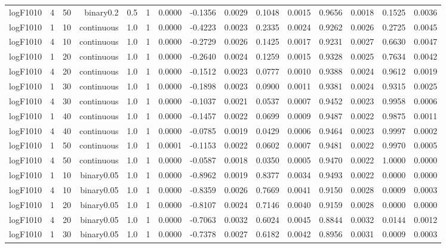 \begin{longtable}{rrrrrrrrrrrrrrr}
  logF1010 & 4 & 50 & binary0.2 & 0.5 & 1 & 0.0000 & -0.1356 & 0.0029 & 0.1048 & 0.0015 & 0.9656 & 0.0018 & 0.1525 & 0.0036 \\ 
  logF1010 & 1 & 10 & continuous & 1.0 & 1 & 0.0000 & -0.4223 & 0.0023 & 0.2335 & 0.0024 & 0.9262 & 0.0026 & 0.2725 & 0.0045 \\ 
  logF1010 & 4 & 10 & continuous & 1.0 & 1 & 0.0000 & -0.2729 & 0.0026 & 0.1425 & 0.0017 & 0.9231 & 0.0027 & 0.6630 & 0.0047 \\ 
  logF1010 & 1 & 20 & continuous & 1.0 & 1 & 0.0000 & -0.2640 & 0.0024 & 0.1259 & 0.0015 & 0.9328 & 0.0025 & 0.7634 & 0.0042 \\ 
  logF1010 & 4 & 20 & continuous & 1.0 & 1 & 0.0000 & -0.1512 & 0.0023 & 0.0777 & 0.0010 & 0.9388 & 0.0024 & 0.9612 & 0.0019 \\ 
  logF1010 & 1 & 30 & continuous & 1.0 & 1 & 0.0000 & -0.1898 & 0.0023 & 0.0900 & 0.0011 & 0.9381 & 0.0024 & 0.9315 & 0.0025 \\ 
  logF1010 & 4 & 30 & continuous & 1.0 & 1 & 0.0000 & -0.1037 & 0.0021 & 0.0537 & 0.0007 & 0.9452 & 0.0023 & 0.9958 & 0.0006 \\ 
  logF1010 & 1 & 40 & continuous & 1.0 & 1 & 0.0000 & -0.1457 & 0.0022 & 0.0699 & 0.0009 & 0.9487 & 0.0022 & 0.9875 & 0.0011 \\ 
  logF1010 & 4 & 40 & continuous & 1.0 & 1 & 0.0000 & -0.0785 & 0.0019 & 0.0429 & 0.0006 & 0.9464 & 0.0023 & 0.9997 & 0.0002 \\ 
  logF1010 & 1 & 50 & continuous & 1.0 & 1 & 0.0001 & -0.1153 & 0.0022 & 0.0602 & 0.0007 & 0.9481 & 0.0022 & 0.9970 & 0.0005 \\ 
  logF1010 & 4 & 50 & continuous & 1.0 & 1 & 0.0000 & -0.0587 & 0.0018 & 0.0350 & 0.0005 & 0.9470 & 0.0022 & 1.0000 & 0.0000 \\ 
  logF1010 & 1 & 10 & binary0.05 & 1.0 & 1 & 0.0000 & -0.8962 & 0.0019 & 0.8377 & 0.0034 & 0.9493 & 0.0022 & 0.0000 & 0.0000 \\ 
  logF1010 & 4 & 10 & binary0.05 & 1.0 & 1 & 0.0000 & -0.8359 & 0.0026 & 0.7669 & 0.0041 & 0.9150 & 0.0028 & 0.0009 & 0.0003 \\ 
  logF1010 & 1 & 20 & binary0.05 & 1.0 & 1 & 0.0000 & -0.8107 & 0.0024 & 0.7146 & 0.0040 & 0.9159 & 0.0028 & 0.0000 & 0.0000 \\ 
  logF1010 & 4 & 20 & binary0.05 & 1.0 & 1 & 0.0000 & -0.7063 & 0.0032 & 0.6024 & 0.0045 & 0.8844 & 0.0032 & 0.0144 & 0.0012 \\ 
  logF1010 & 1 & 30 & binary0.05 & 1.0 & 1 & 0.0000 & -0.7378 & 0.0027 & 0.6182 & 0.0042 & 0.8956 & 0.0031 & 0.0009 & 0.0003 \\ 

\end{longtable}
